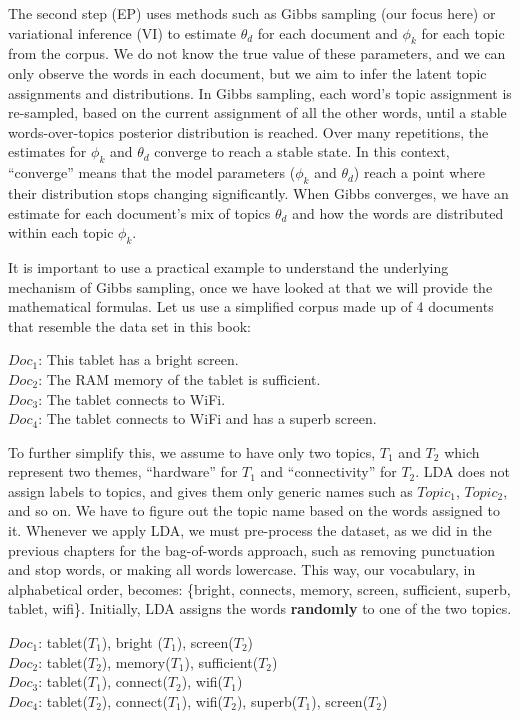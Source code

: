 The second step (EP) uses methods such as Gibbs sampling (our focus
here) or variational inference (VI) to estimate \(\theta_d\) for each
document and \(\phi_k\) for each topic from the corpus. We do
not know the true value of these parameters, and we can only observe the
words in each document, but we aim to infer the latent topic assignments
and distributions. In Gibbs sampling, each word's topic assignment is
re-sampled, based on the current assignment of all the other words, until
a stable words-over-topics posterior distribution is reached. Over many
repetitions, the estimates for \(\phi_k\) and \(\theta_d\)
converge to reach a stable state. In this context, ``converge'' means that
the model parameters (\(\phi_k\) and \(\theta_d\)) reach a point where
their distribution stops changing significantly. When Gibbs converges,
we have an estimate for each document's mix of topics \(\theta_d\) and how
the words are distributed within each topic \(\phi_k\).

It is important to use a practical example to understand the underlying
mechanism of Gibbs sampling, once we have looked at that we will provide the mathematical
formulas. Let us use a simplified corpus made up of 4 documents that
resemble the data set in this book:

\(Doc_1\): This tablet has a bright screen.\\
\(Doc_2\): The RAM memory of the tablet is sufficient.\\
\(Doc_3\): The tablet connects to WiFi.\\
\(Doc_4\): The tablet connects to WiFi and has a superb screen.

To further simplify this, we assume to have only two topics, \(T_1\) and
\(T_2\) which represent two themes, ``hardware'' for \(T_1\) and
``connectivity'' for \(T_2\). LDA does not assign labels to topics,
and gives them only generic names such as \(Topic_1\), \(Topic_2\), and so on.
We have to figure out the topic name based on the words assigned to it. Whenever
we apply LDA, we must pre-process the dataset, as we did in the
previous chapters for the bag-of-words approach, such as removing punctuation and stop words, or making all words lowercase. This way, our
vocabulary, in alphabetical order, becomes: \{bright, connects,  memory, screen, sufficient, superb, tablet, wifi\}. Initially, LDA assigns the words
\textbf{randomly} to one of the two topics.

\(Doc_1\): tablet(\(T_1\)), bright (\(T_1\)), screen(\(T_2\))\\
\(Doc_2\): tablet(\(T_2\)), memory(\(T_1\)), sufficient(\(T_2\))\\
\(Doc_3\): tablet(\(T_1\)), connect(\(T_2\)), wifi(\(T_1\))\\
\(Doc_4\): tablet(\(T_2\)), connect(\(T_1\)), wifi(\(T_2\)),
superb(\(T_1\)), screen(\(T_2\))

